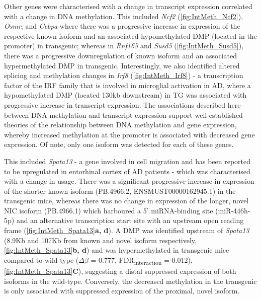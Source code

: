 Other genes were characterised with a change in transcript expression correlated with a change in DNA methylation. This included \textit{Ncf2} (\cref{fig:IntMeth_Ncf2}), \textit{Osmr}, and \textit{Cebpa} where there was a progressive increase in expression of the respective known isoform and an associated hypomethylated DMP (located in the promoter) in transgenic; whereas in \textit{Rnf165} and \textit{Susd5} (\cref{fig:IntMeth_Susd5}), there was a progressive downregulation of known isoform and an associated hypermethylated DMP in transgenic. Interestingly, we also identified altered splicing and methylation changes in \textit{Irf8} (\cref{fig:IntMeth_Irf8}) - a transcription factor of the IRF family that is involved in microglial activation in AD\cite{Zeng2017}, where a hypomethylated DMP (located 130kb downstream) in TG was associated with progressive increase in transcript expression. The associations described here between DNA methylation and transcript expression support well-established theories of the relationship between DNA methylation and gene expression, whereby increased methylation at the promoter is associated with decreased gene expression. Of note, only one isoform was detected for each of these genes.  

This included \textit{Spata13} - a gene involved in cell migration\cite{Bourbia2019} and has been reported to be upregulated in entorhinal cortex of AD patients\cite{Yan2019} - which was characterised with a change in usage. There was a significant progressive increase in expression of the shorter known isoform (PB.4966.2, ENSMUST00000162945.1) in the transgenic mice, whereas there was no change in expression of the longer, novel NIC isoform (PB.4966.1) which harboured a 5' miRNA-binding site (miR-446h-5p) and an alternative transcription start site with an upstream open reading frame (\cref{fig:IntMeth_Spata13}\textbf{a, d}). A DMP was identified upstream of \textit{Spata13} (8.9Kb and 107Kb from known and novel isoform respectively, \cref{fig:IntMeth_Spata13}\textbf{b, d}) and was hypermethylated in transgenic mice compared to wild-type ($\Delta$$\beta$ = 0.777, FDR\textsubscript{interaction} = 0.012), \cref{fig:IntMeth_Spata13}\textbf{C}), suggesting a distal suppressed expression of both isoforms in the wild-type. Conversely, the decreased methylation in the transgenic is only associated with suppressed expression of the proximal, novel isoform. 

